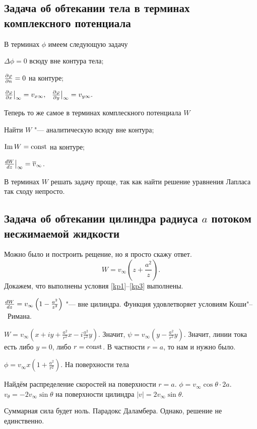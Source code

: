 \subsection{Задача об обтекании тела в терминах комплексного потенциала}
В терминах $\phi$ имеем следующую задачу
\begin{roItems}
  \item  $\Delta\phi = 0$ всюду вне контура тела;
  \item  $\frac{\partial \varphi}{\partial n}=0$ на контуре;
  \item  $\frac{\partial \varphi}{\partial x}\big|_{\infty} = v_{x\infty},\hskip .75em plus.1em minus.08em\relax \frac{\partial \varphi}{\partial y}\big|_{\infty} = v_{y\infty}.$
\end{roItems}

Теперь  то же самое в терминах комплескного потенциала $W$
\begin{roItems}
  \item \label{kp1} Найти $W$ "--- аналитическую всюду вне контура;
  \item \label{kp2} $\mathop{\mathrm{Im}} W = \operatorname{const}$ на контуре;
  \item \label{kp3} $\frac{dW}{dz}\big|_\infty = \overline{v}_{\infty}$.
\end{roItems}

В терминах $W$ решать задачу проще, так как найти решение уравнения Лапласа так сходу непросто.
\subsection{Задача об обтекании цилиндра радиуса $a$ потоком несжимаемой жидкости}

Можно было и построить рещение, но я просто скажу ответ. 
\[
  W = v_\infty\left(z + \frac{a^2}z\right).
\]
Докажем, что выполнены условия \eqref{kp1}--\eqref{kp3} выполнены.
\begin{roItems}
  \item $\frac{dW}{dz} = v_\infty\left(1 - \frac{a^2}{z^2}\right)$ "--- вне цилиндра. Функция удовлетворяет условиям Коши"--~Римана.
  \item $ W = v_\infty\left(x+i y + \frac{a^2}{r^2}x-i\frac{a^2}{r^2}y\right)$. Значит, $\psi = v_\infty\left(y-\frac{a^2}{r^2} y\right)$. Значит, линии тока есть либо $y=0$, либо $r=\operatorname{const}$. В частности $r=a$, то нам и нужно было.
  \item $\phi = v_\infty x\left(1+\frac{a^2}{r^2}\right)$. На поверхности тела 
\end{roItems}

Найдём распределение скоростей на поверхности $r=a$. $\phi = v_\infty\cos\theta\cdot 2 a$. $v_\theta = -2v_\infty\sin\theta$ на поверхности цилиндра $|v| = 2 v_\infty \sin\theta$.

Суммарная сила будет ноль. Парадокс Даламбера. Однако, решение не единственно.

